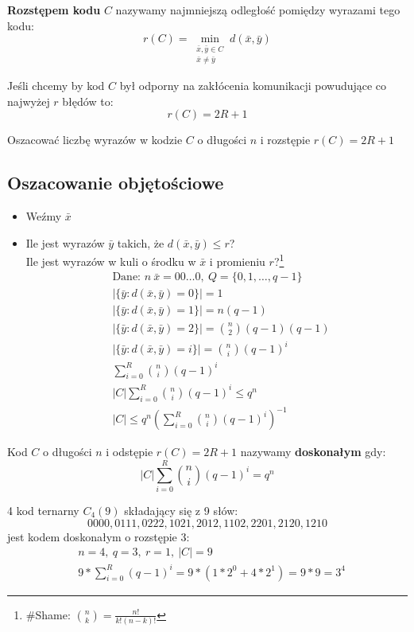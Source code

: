 \begin{definition}
\textbf{Rozstępem kodu} $C$ nazywamy najmniejszą odległość pomiędzy wyrazami tego kodu: $$r(C)=\min _{\begin{matrix}
\bar{x},\bar{y}\in C\\
\bar{x}\neq \bar{y}
\end{matrix}}d(\bar{x},\bar{y})$$
\end{definition}
\begin{observation*}
Jeśli chcemy by kod $C$ był odporny na zakłócenia komunikacji powudujące co najwyżej $r$ błędów to: $$r(C)=2R+1$$
\end{observation*}
\begin{problem*}
Oszacować liczbę wyrazów w kodzie $C$ o długości $n$ i rozstępie $r(C)=2R+1$
\end{problem*}
\subsection{Oszacowanie objętościowe}
\begin{itemize}
\item Weźmy $\bar{x}$
\item Ile jest wyrazów $\bar{y}$ takich, że $d(\bar{x},\bar{y})\leq r$?\\
Ile jest wyrazów w kuli o środku w $\bar{x}$ i promieniu $r$?\footnote{\#Shame: $\binom{n}{k}=\frac{n!}{k!(n-k)!}$}
\begin{align*}
&\text{Dane: }n\ \bar{x}=00\dots 0,\ Q=\{0,1,\dots ,q-1\}\\
&|\{\bar{y}:d(\bar{x},\bar{y})=0\}|=1\\
&|\{\bar{y}:d(\bar{x},\bar{y})=1\}|=n(q-1)\\
&|\{\bar{y}:d(\bar{x},\bar{y})=2\}|=\binom{n}{2}(q-1)(q-1)\\
&|\{\bar{y}:d(\bar{x},\bar{y})=i\}|=\binom{n}{i}(q-1)^i\\
&\sum _{i=0}^R\binom{n}{i}(q-1)^i\\
&|C|\sum _{i=0}^R\binom{n}{i}(q-1)^i\leq q^n\\
&|C|\leq  q^n\left(\sum _{i=0}^R\binom{n}{i}(q-1)^i\right)^{-1}
\end{align*}
\end{itemize}
\begin{definition}
Kod $C$ o długości $n$ i odstępie $r(C)=2R+1$ nazywamy \textbf{doskonałym} gdy: $$|C|\sum _{i=0}^R\binom{n}{i}(q-1)^i= q^n$$
\end{definition}
\begin{example*}
4 kod ternarny $C_4(9)$ składający się z 9 słów: $$0000,0111,0222,1021,2012,1102,2201,2120,1210$$ jest kodem doskonałym o rozstępie 3:
\begin{align*}
&n=4,\ q=3,\ r=1,\ |C|=9\\
&9*\sum_{i=0}^R(q-1)^i=9*\left(1*2^0+4*2^1\right)=9*9=3^4
\end{align*}
\end{example*}

